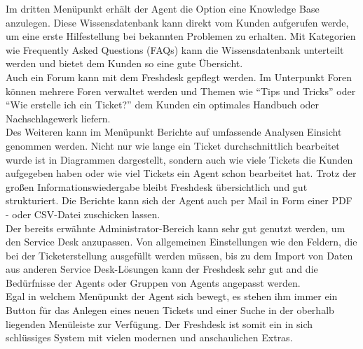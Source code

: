 Im dritten Menüpunkt erhält der Agent die Option eine Knowledge Base anzulegen. Diese Wissensdatenbank kann direkt vom Kunden aufgerufen werde, um eine erste Hilfestellung bei bekannten Problemen zu erhalten. Mit Kategorien wie Frequently Asked Questions (FAQs) kann die Wissensdatenbank unterteilt werden und bietet dem Kunden so eine gute Übersicht.\\
Auch ein Forum kann mit dem Freshdesk gepflegt werden. Im Unterpunkt Foren können mehrere Foren verwaltet werden und Themen wie \enquote{Tips und Tricks} oder \enquote{Wie erstelle ich ein Ticket?} dem Kunden ein optimales Handbuch oder Nachschlagewerk liefern.\\
Des Weiteren kann im Menüpunkt Berichte auf umfassende Analysen Einsicht genommen werden. Nicht nur wie lange ein Ticket durchschnittlich bearbeitet wurde ist in Diagrammen dargestellt, sondern auch wie viele Tickets die Kunden aufgegeben haben oder wie viel Tickets ein Agent schon bearbeitet hat. Trotz der großen Informationswiedergabe bleibt Freshdesk übersichtlich und gut strukturiert. Die Berichte kann sich der Agent auch per Mail in Form einer PDF - oder CSV-Datei zuschicken lassen.\\
Der bereits erwähnte Administrator-Bereich kann sehr gut genutzt werden, um den Service Desk anzupassen. Von allgemeinen Einstellungen wie den Feldern, die bei der Ticketerstellung ausgefüllt werden müssen, bis zu dem Import von Daten aus anderen Service Desk-Lösungen kann der Freshdesk sehr gut and die Bedürfnisse der Agents oder Gruppen von Agents angepasst werden.\\
Egal in welchem Menüpunkt der Agent sich bewegt, es stehen ihm immer ein Button für das Anlegen eines neuen Tickets und einer Suche in der oberhalb liegenden Menüleiste zur Verfügung. Der Freshdesk ist somit ein in sich schlüssiges System mit vielen modernen und anschaulichen Extras.\\\\


